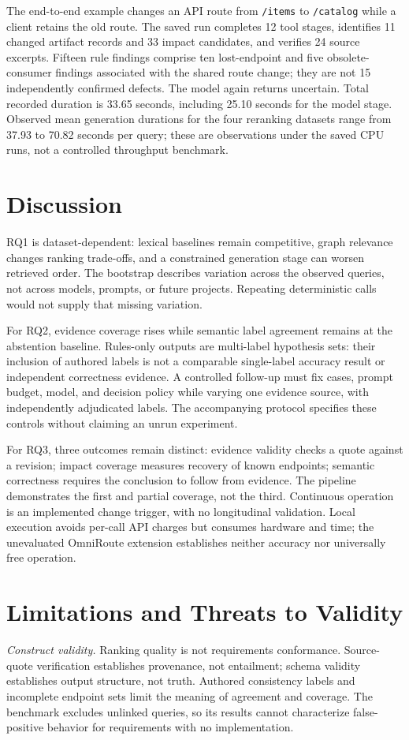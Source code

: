 \documentclass[conference,letterpaper,10pt]{IEEEtran}
\begin{document}
The end-to-end example changes an API route from \texttt{/items} to \texttt{/catalog} while a client retains the old route. The saved run completes 12 tool stages, identifies 11 changed artifact records and 33 impact candidates, and verifies 24 source excerpts. Fifteen rule findings comprise ten lost-endpoint and five obsolete-consumer findings associated with the shared route change; they are not 15 independently confirmed defects. The model again returns uncertain. Total recorded duration is 33.65 seconds, including 25.10 seconds for the model stage. Observed mean generation durations for the four reranking datasets range from 37.93 to 70.82 seconds per query; these are observations under the saved CPU runs, not a controlled throughput benchmark.

\section{Discussion}
RQ1 is dataset-dependent: lexical baselines remain competitive, graph relevance changes ranking trade-offs, and a constrained generation stage can worsen retrieved order. The bootstrap describes variation across the observed queries, not across models, prompts, or future projects. Repeating deterministic calls would not supply that missing variation.

For RQ2, evidence coverage rises while semantic label agreement remains at the abstention baseline. Rules-only outputs are multi-label hypothesis sets: their inclusion of authored labels is not a comparable single-label accuracy result or independent correctness evidence. A controlled follow-up must fix cases, prompt budget, model, and decision policy while varying one evidence source, with independently adjudicated labels. The accompanying protocol specifies these controls without claiming an unrun experiment.

For RQ3, three outcomes remain distinct: evidence validity checks a quote against a revision; impact coverage measures recovery of known endpoints; semantic correctness requires the conclusion to follow from evidence. The pipeline demonstrates the first and partial coverage, not the third. Continuous operation is an implemented change trigger, with no longitudinal validation. Local execution avoids per-call API charges but consumes hardware and time; the unevaluated OmniRoute extension establishes neither accuracy nor universally free operation.

\section{Limitations and Threats to Validity}
\textit{Construct validity.} Ranking quality is not requirements conformance. Source-quote verification establishes provenance, not entailment; schema validity establishes output structure, not truth. Authored consistency labels and incomplete endpoint sets limit the meaning of agreement and coverage. The benchmark excludes unlinked queries, so its results cannot characterize false-positive behavior for requirements with no implementation.
\end{document}
